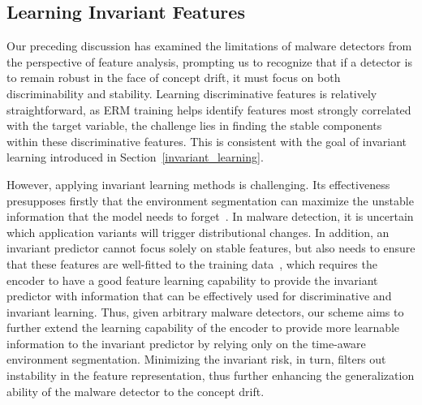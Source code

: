 \subsection{Learning Invariant Features}

Our preceding discussion has examined the limitations of malware detectors from the perspective of feature analysis, prompting us to recognize that if a detector is to remain robust in the face of concept drift, it must focus on both discriminability and stability. Learning discriminative features is relatively straightforward, as ERM training helps identify features most strongly correlated with the target variable, the challenge lies in finding the stable components within these discriminative features. This is consistent with the goal of invariant learning introduced in Section~\ref{invariant_learning}.

However, applying invariant learning methods is challenging. Its effectiveness presupposes firstly that the environment segmentation can maximize the unstable information that the model needs to forget~\cite{environment_label, env_label}. In malware detection, it is uncertain which application variants will trigger distributional changes. In addition, an invariant predictor cannot focus solely on stable features, but also needs to ensure that these features are well-fitted to the training data~\cite{yang2024invariant}, which requires the encoder to have a good feature learning capability to provide the invariant predictor with information that can be effectively used for discriminative and invariant learning. Thus, given arbitrary malware detectors, our scheme aims to further extend the learning capability of the encoder to provide more learnable information to the invariant predictor by relying only on the time-aware environment segmentation. Minimizing the invariant risk, in turn, filters out instability in the feature representation, thus further enhancing the generalization ability of the malware detector to the concept drift.

